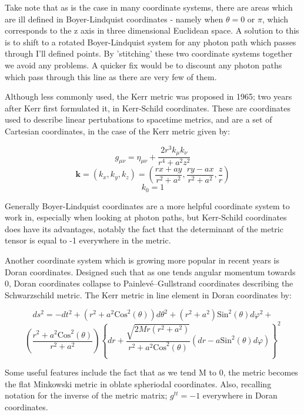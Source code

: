 \documentclass[oneside,openright,frontopenright, singlespacing]{dmathesis}
\begin{document}
\vspace{1em}
	Take note that as is the case in many coordinate systems, there are areas which are ill defined in Boyer-Lindquist coordinates - namely when $\theta = 0\mbox{ or }\pi$, which corresponds to the z axis in three dimensional Euclidean space. A solution to this is to shift to a rotated Boyer-Lindquist system for any photon path which passes through I'll defined points. By 'stitching' these two coordinate systems together we avoid any problems. A quicker fix would be to discount any photon paths which pass through this line as there are very few of them.

\vspace{1em}
	Although less commonly used, the Kerr metric was proposed in 1965; two years after Kerr first formulated it, in Kerr-Schild coordinates. These are coordinates used to describe linear pertubations to spacetime metrics, and are a set of Cartesian coordinates, in the case of the Kerr metric given by:

	\[g_{\mu\nu} = \eta_{\mu\nu} + \frac{2r^{3}k_{\mu}k_{\nu}}{r^{4}+a^{2}z^{2}}\]
	\[\textbf{k} = (k_x,k_y,k_z) = \left(\frac{rx+ay}{r^2+a^2},\frac{ry-ax}{r^2+a^2},\frac{z}{r}\right)\]
	\[k_0 = 1\]

\vspace{1em}
	Generally Boyer-Lindquist coordinates are a more helpful coordinate system to work in, especially when looking at photon paths, but Kerr-Schild coordinates does have its advantages, notably the fact that the determinant of the metric tensor is equal to -1 everywhere in the metric.

\vspace{1em}
	Another coordinate system which is growing more popular in recent years is Doran coordinates\cite{doran2000new}. Designed such that as one tends angular momentum towards 0, Doran coordinates collapse to Painlev\'e–Gullstrand coordinates\cite{painleve1921mecanique} describing the Schwarzschild metric. The Kerr metric in line element in Doran coordinates by:

	\[ds^2=-dt^2+(r^2+a^2\mbox{Cos}^2(\theta))d\theta^2+(r^2+a^2)\mbox{Sin}^2(\theta)d\varphi^2+\]
	\[\left(\frac{r^2+a^2\mbox{Cos}^2(\theta)}{r^2+a^2}\right)\left\{dr+\frac{\sqrt{2Mr(r^2+a^2)}}{r^2+a^2\mbox{Cos}^2(\theta)}(dr-a\mbox{Sin}^2(\theta)d\varphi)\right\}^2\]

\vspace{1em}
	Some useful features include the fact that as we tend M to 0, the metric becomes the flat Minkowski metric in oblate spheriodal coordinates. Also, recalling notation for the inverse of the metric matrix; $g^{tt}=-1$ everywhere in Doran coordinates.
\end{document}
